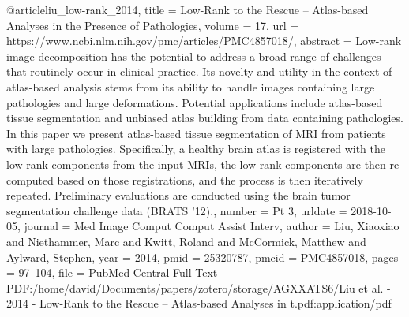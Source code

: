 \documentclass{article}
\begin{document}
@article{liu_low-rank_2014,
	title = {Low-{Rank} to the {Rescue} – {Atlas}-based {Analyses} in the {Presence} of {Pathologies}},
	volume = {17},
	url = {https://www.ncbi.nlm.nih.gov/pmc/articles/PMC4857018/},
	abstract = {Low-rank image decomposition has the potential to address a broad range of challenges that routinely occur in clinical practice. Its novelty and utility in the context of atlas-based analysis stems from its ability to handle images containing large pathologies and large deformations. Potential applications include atlas-based tissue segmentation and unbiased atlas building from data containing pathologies. In this paper we present atlas-based tissue segmentation of MRI from patients with large pathologies. Specifically, a healthy brain atlas is registered with the low-rank components from the input MRIs, the low-rank components are then re-computed based on those registrations, and the process is then iteratively repeated. Preliminary evaluations are conducted using the brain tumor segmentation challenge data (BRATS ’12).},
	number = {Pt 3},
	urldate = {2018-10-05},
	journal = {Med Image Comput Comput Assist Interv},
	author = {Liu, Xiaoxiao and Niethammer, Marc and Kwitt, Roland and McCormick, Matthew and Aylward, Stephen},
	year = {2014},
	pmid = {25320787},
	pmcid = {PMC4857018},
	pages = {97--104},
	file = {PubMed Central Full Text PDF:/home/david/Documents/papers/zotero/storage/AGXXATS6/Liu et al. - 2014 - Low-Rank to the Rescue – Atlas-based Analyses in t.pdf:application/pdf}
}
\end{document}
